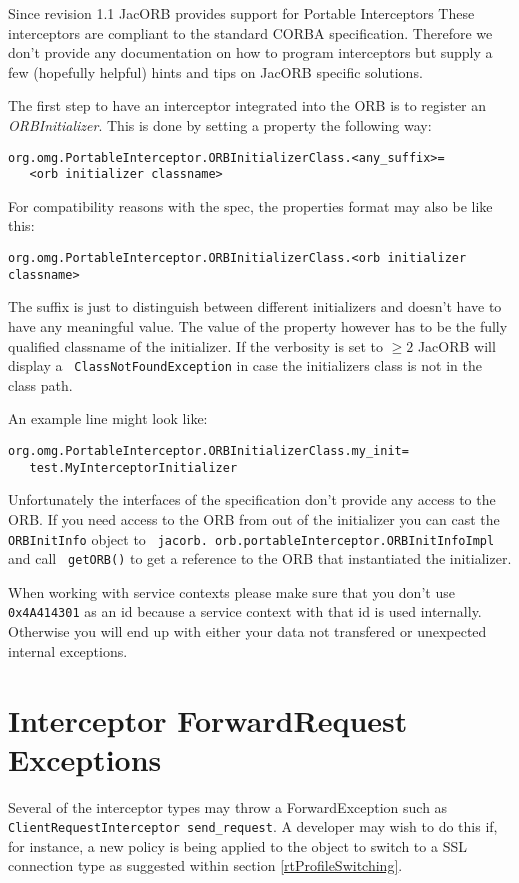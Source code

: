 
Since revision 1.1 JacORB provides support for Portable Interceptors These
interceptors are compliant to the standard CORBA specification.  Therefore we
don't provide any documentation on how to program interceptors but supply a
few (hopefully helpful) hints and tips on JacORB specific solutions.

The first  step to have an  interceptor integrated into the  ORB is to
register an {\em  ORBInitializer}. This is done by  setting a property
the following way:
\begin{verbatim}org.omg.PortableInterceptor.ORBInitializerClass.<any_suffix>=
   <orb initializer classname>
\end{verbatim}

For compatibility reasons with the spec, the properties format may also be
like this:

\begin{verbatim}org.omg.PortableInterceptor.ORBInitializerClass.<orb initializer classname>
\end{verbatim}

The suffix  is just to distinguish between  different initializers and
doesn't have to  have any meaningful value. The  value of the property
however has to be the fully qualified classname of the initializer. If
the  verbosity  is  set  to  $\geq  2$  JacORB  will  display  a  {\tt
ClassNotFoundException} in  case the initializers class is  not in the
class path.

An example line might look like:
\begin{verbatim}org.omg.PortableInterceptor.ORBInitializerClass.my_init=
   test.MyInterceptorInitializer
\end{verbatim}

Unfortunately the  interfaces of  the specification don't  provide any
access to  the ORB.  If  you need  access to the  ORB from out  of the
initializer  you  can  cast  the  {\tt  ORBInitInfo}  object  to  {\tt
jacorb. orb.portableInterceptor.ORBInitInfoImpl}   and   call  {\tt
getORB()}  to  get  a  reference  to the  ORB  that  instantiated  the
initializer.

When working with service contexts please make sure that you don't use {\tt
  0x4A414301} as an id because a service context with that id is used
internally.  Otherwise you will end up with either your data not transfered or
unexpected internal exceptions.

\section{Interceptor ForwardRequest Exceptions}
Several of the interceptor types may throw a ForwardException such as
{\tt ClientRequestInterceptor send\_request}. A developer may wish to do
this if, for instance, a new policy is being applied to the object to switch
to a SSL connection type as suggested within section \ref{rtProfileSwitching}.

